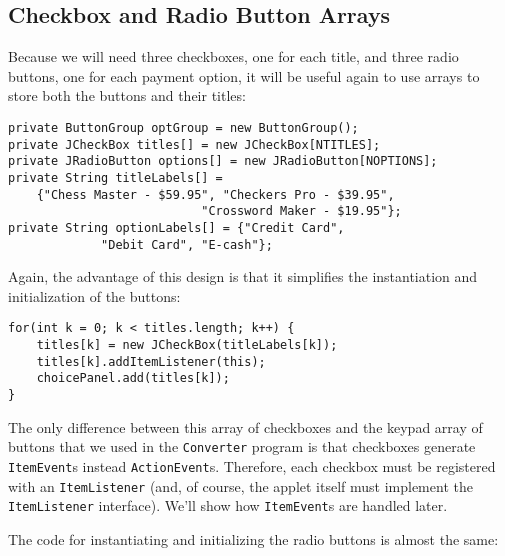 \subsection{Checkbox and Radio Button Arrays}
\noindent Because we will need three checkboxes, one for each title, and three
radio buttons, one for each payment option, it will be useful again to
use arrays to store both the buttons and their titles:

\begin{jjjlisting}[26.5pc]
\begin{lstlisting}
private ButtonGroup optGroup = new ButtonGroup();
private JCheckBox titles[] = new JCheckBox[NTITLES];
private JRadioButton options[] = new JRadioButton[NOPTIONS];
private String titleLabels[] =
    {"Chess Master - $59.95", "Checkers Pro - $39.95",
                           "Crossword Maker - $19.95"};
private String optionLabels[] = {"Credit Card", 
             "Debit Card", "E-cash"};
\end{lstlisting}
\end{jjjlisting}

\noindent Again, the advantage of this design is that it simplifies the
instantiation and initialization of the buttons:

\begin{jjjlisting}
\begin{lstlisting}
for(int k = 0; k < titles.length; k++) {
    titles[k] = new JCheckBox(titleLabels[k]);
    titles[k].addItemListener(this);
    choicePanel.add(titles[k]);
}
\end{lstlisting}
\end{jjjlisting}

\noindent The only difference between this array of checkboxes and the keypad
array of buttons that we used in the {\tt Converter} program is that
checkboxes generate {\tt ItemEvent}s instead
{\tt ActionEvent}s. Therefore, each checkbox must be registered with an
{\tt ItemListener} (and, of course, the applet itself must implement the
{\tt ItemListener} interface).  We'll show how {\tt ItemEvent}s are
handled later.

The code for instantiating and initializing the radio buttons is
almost the same:

